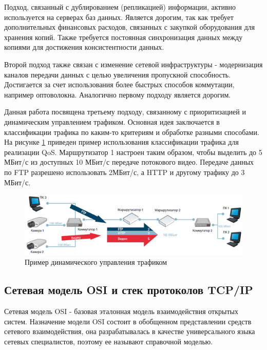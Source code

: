 Подход, связанный с дублированием (репликацией) информации, активно используется на серверах баз данных. Является дорогим, так как требует дополнительных финансовых расходов, связанных с закупкой оборудования для хранения копий. Также требуется постоянная синхронизация данных между копиями для достижения консистентности данных.

Второй подход также связан с изменение сетевой инфраструктуры - модернизация каналов передачи данных с целью увеличения пропускной способность. Достигается за счет использования более быстрых способов коммутации, например оптоволокна. Аналогично первому подходу является дорогим.

Данная работа посвящена третьему подходу, связанному с приоритизацией и динамическим управлением трафиком. Основная идея заключается в классификации трафика по каким-то критериям и обработке разными способами. На рисунке \ref{pic:qos_simple_example} приведен пример использования классификации трафика для реализации QoS. Маршрутизатор 1 настроен таким образом, чтобы выделить до 5 МБит/с из доступных 10 МБит/с передаче потокового видео. Передаче данных по FTP разрешено использовать 2МБит/с, а HTTP и другому трафику до 3 МБит/с.
\begin{figure}
\centering
\includegraphics[scale=0.7]{pictures/qos_simple_example}
\caption{Пример динамического управления трафиком}
\label{pic:qos_simple_example}
\end{figure}

\subsection{Сетевая модель OSI и стек протоколов TCP/IP}
Сетевая модель OSI - базовая эталонная модель взаимодействия открытых систем. Назначение модели OSI состоит в обобщенном представлении средств сетевого взаимодействия, она разрабатывалась в качестве универсального языка сетевых специалистов, поэтому ее называют справочной моделью.

